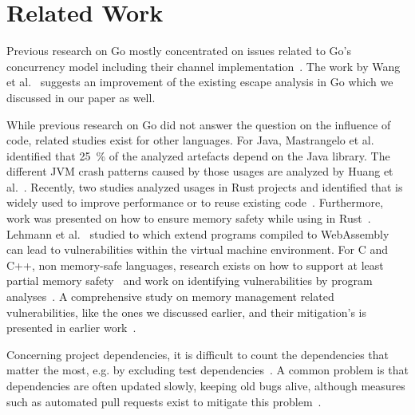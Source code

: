 \section{Related Work}
\label{sec:rw}

Previous research on Go mostly concentrated on issues related to Go's concurrency model including their channel implementation~\cite{tu2019,dilley2019,giunti2020,gabet2020,lange2017,bodden2016information}.
The work by Wang et al.~\cite{wang2020} suggests an improvement of the existing escape analysis in Go which we discussed in our paper as well. 


While previous research on Go did not answer the question on the influence of \unsafe{} code, related studies exist for other languages. 
For Java, Mastrangelo et al.~\cite{mastrangelo2015} identified that 25~\% of the analyzed artefacts depend on the Java \unsafe{} library.
The different JVM crash patterns caused by those usages are analyzed by Huang et al.~\cite{huang2019}.
Recently, two studies analyzed \unsafe{} usages in Rust projects and identified that \unsafe{} is widely used to improve performance or to reuse existing code~\cite{qin2020,evans2020}.
Furthermore, work was presented on how to ensure memory safety while using \unsafe{} in Rust~\cite{hussain2018Fidelius}.
Lehmann et al.~\cite{lehmann-everything-2020} studied to which extend \unsafe{} programs compiled to WebAssembly can lead to vulnerabilities within the virtual machine environment. %
%
%
For C and C++, non memory-safe languages, research exists on how to support at least partial memory safety~\cite{burow2018CUP, nagarkatte2009SoftBound} and work on identifying vulnerabilities by program analyses~\cite{song2019sok}.
A comprehensive study on memory management related vulnerabilities, like the ones we discussed earlier, and their mitigation's is presented in earlier work~\cite{szekeres2013sok}.

Concerning project dependencies, it is difficult to count the dependencies that matter the most, e.g. by excluding test dependencies~\cite{pashchenko2018}.
A common problem is that dependencies are often updated slowly, keeping old bugs alive, although measures such as automated pull requests exist to mitigate this problem~\cite{derr2017keep, mirhosseini2017, lauinger2017}.


